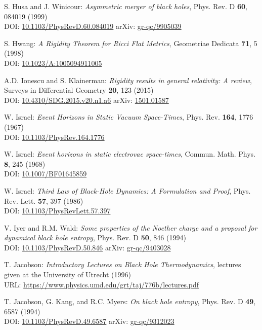\begin{thebibliography}{123}
S. Husa and J. Winicour:
{\em Asymmetric merger of black holes},
Phys. Rev. D {\bf 60}, 084019 (1999)\\
DOI: \href{https://doi.org/10.1103/PhysRevD.60.084019}{10.1103/PhysRevD.60.084019}\hfill
arXiv: \href{https://arxiv.org/abs/gr-qc/9905039}{gr-qc/9905039}

S. Hwang:
{\em A Rigidity Theorem for Ricci Flat Metrics},
Geometriae Dedicata {\bf 71}, 5 (1998)\\
DOI: \href{https://doi.org/10.1023/A:1005094911005}{10.1023/A:1005094911005}

A.D. Ionescu and S. Klainerman:
{\em Rigidity results in general relativity: A review},
Surveys in Differential Geometry {\bf 20}, 123 (2015)\\
DOI: \href{https://dx.doi.org/10.4310/SDG.2015.v20.n1.a6}{10.4310/SDG.2015.v20.n1.a6}\hfill
arXiv: \href{https://arxiv.org/abs/1501.01587}{1501.01587}

W. Israel: {\em Event Horizons in Static Vacuum Space-Times},
Phys. Rev. {\bf 164}, 1776 (1967)\\
DOI: \href{https://doi.org/10.1103/PhysRev.164.1776}{10.1103/PhysRev.164.1776}

W. Israel: {\em Event horizons in static electrovac space-times},
Commun. Math. Phys. {\bf 8}, 245 (1968)\\
DOI: \href{https://doi.org/10.1007/BF01645859}{10.1007/BF01645859}

W. Israel:
{\em Third Law of Black-Hole Dynamics: A Formulation and Proof},
Phys. Rev. Lett. {\bf 57}, 397 (1986)\\
DOI: \href{https://doi.org/10.1103/PhysRevLett.57.397}{10.1103/PhysRevLett.57.397}

V. Iyer and R.M. Wald:
{\em Some properties of the Noether charge and a proposal for dynamical black hole entropy},
Phys. Rev. D {\bf 50}, 846 (1994)\\
DOI: \href{https://doi.org/10.1103/PhysRevD.50.846}{10.1103/PhysRevD.50.846}\hfill
arXiv: \href{https://arxiv.org/abs/gr-qc/9403028}{gr-qc/9403028}

T. Jacobson:
{\em Introductory Lectures on Black Hole Thermodynamics},
lectures given at the University of Utrecht (1996)\\
URL: \url{https://www.physics.umd.edu/grt/taj/776b/lectures.pdf}

T. Jacobson, G. Kang, and R.C. Myers:
{\em On black hole entropy},
Phys. Rev. D {\bf 49}, 6587 (1994)\\
DOI: \href{https://doi.org/10.1103/PhysRevD.49.6587}{10.1103/PhysRevD.49.6587}\hfill
arXiv: \href{https://arxiv.org/abs/gr-qc/9312023}{gr-qc/9312023}


\end{thebibliography}
